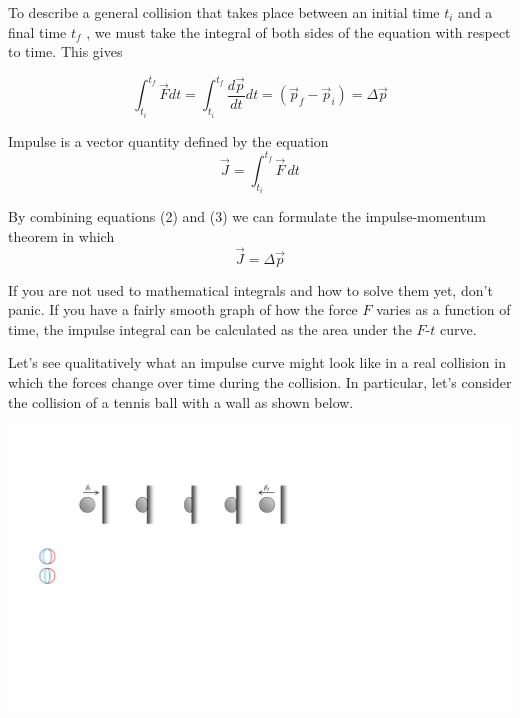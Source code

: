 To describe a general collision that takes place between an initial time $t_{i}$
and a final time $t_{f}$ , we must take the integral of both sides of the
equation with respect to time. This gives

\begin{equation}
\int _{t_{i}}^{t_{f}}{\vec  F}dt=\int _{t_{i}}^{t_{f}}\frac{d{\vec  p}}{dt}dt=\left( {{\vec  p}_{f}}-{{\vec  p}_{i}}\right) =\Delta {\vec  p}
\end{equation}

Impulse is a vector quantity defined by the equation
\begin{equation}
{\vec  J}=\int_{t_{i}}^{t_{f}}{\vec  F}\,dt
\end{equation}

By combining equations (2) and (3) we can formulate the impulse-momentum
theorem in which
\begin{equation}
{\vec  J}=\Delta {\vec  p}
\end{equation}

If you are not used to mathematical integrals and how to solve them yet, don't
panic. If you have a fairly smooth graph of how the force $F$ varies as a function
of time, the impulse integral can be calculated as the area under the $F$-$t$ 
curve.

Let's see qualitatively what an impulse curve might look like in a real collision
in which the forces change over time during the collision. In particular, let's
consider the collision of a tennis ball with a wall as shown below.

\vspace{0.3cm}
{\par\centering \includegraphics{impulse/ball_hitting_wall.pdf} \par}
\vspace{0.3cm}

